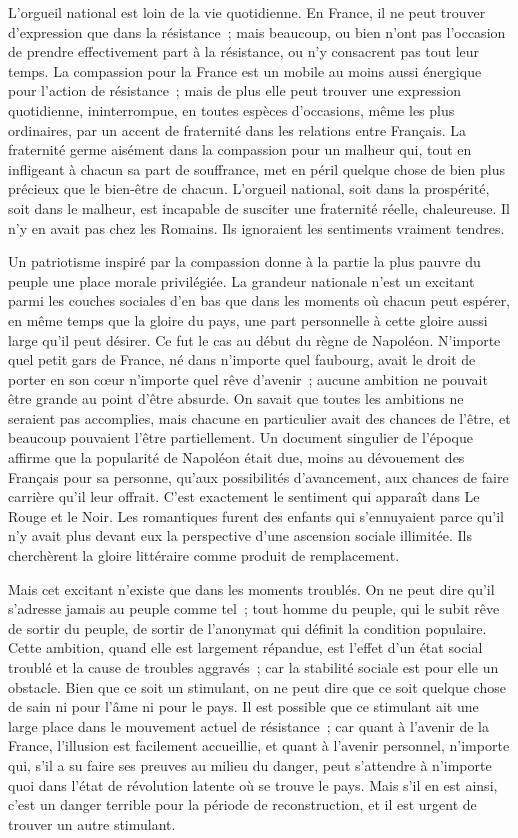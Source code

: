 \documentclass[french,twoside]{book} %
\begin{document}
L'orgueil national est loin de la vie quotidienne. En France, il ne peut trouver d'expression que dans la résistance ; mais beaucoup, ou bien n'ont pas l'occasion de prendre effectivement part à la résistance, ou n'y consacrent pas tout leur temps. La compassion pour la France est un mobile au moins aussi énergique pour l'action de résistance ; mais de plus elle peut trouver une expression quotidienne, ininterrompue, en toutes espèces d'occasions, même les plus ordinaires, par un accent de fraternité dans les relations entre Français. La fraternité germe aisément dans la compassion pour un malheur qui, tout en infligeant à chacun sa part de souffrance, met en péril quelque chose de bien plus précieux que le bien-être de chacun. L'orgueil national, soit dans la prospérité, soit dans le malheur, est incapable de susciter une fraternité réelle, chaleureuse. Il n'y en avait pas chez les Romains. Ils ignoraient les sentiments vraiment tendres.\par
Un patriotisme inspiré par la compassion donne à la partie la plus pauvre du peuple une place morale privilégiée. La grandeur nationale n'est un excitant parmi les couches sociales d'en bas que dans les moments où chacun peut espérer, en même temps que la gloire du pays, une part personnelle à cette gloire aussi large qu'il peut désirer. Ce fut le cas au début du règne de Napoléon. N'importe quel petit gars de France, né dans n'importe quel faubourg, avait le droit de porter en son cœur n'importe quel rêve d'avenir ; aucune ambition ne pouvait être grande au point d'être absurde. On savait que toutes les ambitions ne seraient pas accomplies, mais chacune en particulier avait des chances de l'être, et beaucoup pouvaient l'être partiellement. Un document singulier de l'époque affirme que la popularité de Napoléon était due, moins au dévouement des Français pour sa personne, qu'aux possibilités d'avancement, aux chances de faire carrière qu'il leur offrait. C'est exactement le sentiment qui apparaît dans Le Rouge et le Noir. Les romantiques furent des enfants qui s'ennuyaient parce qu'il n'y avait plus devant eux la perspective d'une ascension sociale illimitée. Ils cherchèrent la gloire littéraire comme produit de remplacement.\par
Mais cet excitant n'existe que dans les moments troublés. On ne peut dire qu'il s'adresse jamais au peuple comme tel ; tout homme du peuple, qui le subit rêve de sortir du peuple, de sortir de l'anonymat qui définit la condition populaire. Cette ambition, quand elle est largement répandue, est l'effet d'un état social troublé et la cause de troubles aggravés ; car la stabilité sociale est pour elle un obstacle. Bien que ce soit un stimulant, on ne peut dire que ce soit quelque chose de sain ni pour l'âme ni pour le pays. Il est possible que ce stimulant ait une large place dans le mouvement actuel de résistance ; car quant à l'avenir de la France, l'illusion est facilement accueillie, et quant à l'avenir personnel, n'importe qui, s'il a su faire ses preuves au milieu du danger, peut s'attendre à n'importe quoi dans l'état de révolution latente où se trouve le pays. Mais s'il en est ainsi, c'est un danger terrible pour la période de reconstruction, et il est urgent de trouver un autre stimulant.\par
\end{document}
